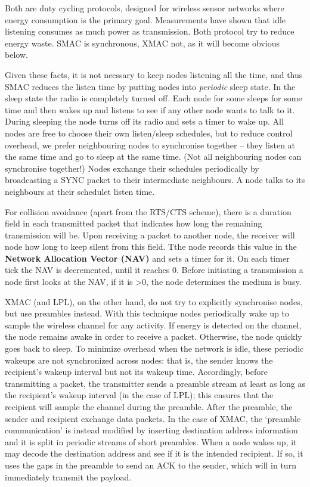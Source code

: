\documentclass[12pt]{article}
\begin{document}
Both are duty cycling protocols, designed for wireless sensor networks where
energy consumption is the primary goal. Measurements have shown that idle
listening consumes as much power as transmission. Both protocol try to reduce
energy waste. SMAC is synchronous, XMAC not, as it will become obvious below.

Given these facts, it is not necssary to keep nodes listening all the time, and
thus SMAC reduces the listen time by putting nodes into \emph{periodic} sleep
state. In the sleep state the radio is completely turned off. Each node for
some sleeps for some time and then wakes up and listens to see if any other
node wants to talk to it. During sleeping the node turns off its radio and sets
a timer to wake up. All nodes are free to choose their own listen/sleep
schedules, but to reduce control overhead, we prefer neighbouring nodes to
synchronise together -- they listen at the same time and go to sleep at the
same time. (Not all neighbouring nodes can synchronise together!) Nodes
exchange their schedules periodically by broadcasting a SYNC packet to their
intermediate neighbours. A node talks to its neighbours at their schedulet
listen time.

For collision avoidance (apart from the RTS/CTS scheme), there is a duration
field in each transmitted packet that indicates how long the remaining
transmission will be.  Upon receiving a packet to another node, the receiver
will node how long to keep silent from this field. Tthe node records this value
in the \textbf{Network Allocation Vector (NAV)} and sets a timer for it. On
each timer tick the NAV is decremented, until it reaches 0. Before initiating
a transmission a node first looks at the NAV, if it is >0, the node determines
the medium is busy.

XMAC (and LPL), on the other hand, do not try to explicitly synchronise nodes,
but use preambles instead. With this technique nodes periodically wake up to
sample the wireless channel for any activity. If energy is detected on the
channel, the node remains awake in order to receive a packet. Otherwise, the
node quickly goes back to sleep. To minimize overhead when the network is idle,
these periodic wakeups are not synchronized across nodes: that is, the sender
knows the recipient's wakeup interval but not its wakeup time. Accordingly,
before transmitting a packet, the transmitter sends a preamble stream at least
as long as the recipient's wakeup interval (in the case of LPL); this ensures
that the recipient will sample the channel during the preamble. After the
preamble, the sender and recipient exchange data packets. In the case of XMAC,
the `preamble communication' is instead modified by inserting destination
address information and it is split in periodic streams of short preambles.
When a node wakes up, it may decode the destination address and see if it is
the intended recipient. If so, it uses the gaps in the preamble to send an ACK
to the sender, which will in turn immediately transmit the payload.
\end{document}
